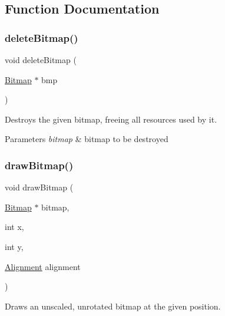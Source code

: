 \subsection{Function Documentation}
\hypertarget{group___bitmap_ga08c1d4f4fff81df260d979ea8fc1aa61}{}\label{group___bitmap_ga08c1d4f4fff81df260d979ea8fc1aa61} 
\subsubsection{\texorpdfstring{delete\+Bitmap()}{deleteBitmap()}}
{\footnotesize\ttfamily void delete\+Bitmap (\begin{DoxyParamCaption}\item[{\hyperlink{struct_bitmap}{Bitmap} $\ast$}]{bmp }\end{DoxyParamCaption})}



Destroys the given bitmap, freeing all resources used by it. 


\begin{DoxyParams}{Parameters}
{\em bitmap} & bitmap to be destroyed \\
\hline
\end{DoxyParams}
\hypertarget{group___bitmap_ga18d05a1c671f4638bc63d37874efb9d4}{}\label{group___bitmap_ga18d05a1c671f4638bc63d37874efb9d4} 
\subsubsection{\texorpdfstring{draw\+Bitmap()}{drawBitmap()}}
{\footnotesize\ttfamily void draw\+Bitmap (\begin{DoxyParamCaption}\item[{\hyperlink{struct_bitmap}{Bitmap} $\ast$}]{bitmap,  }\item[{int}]{x,  }\item[{int}]{y,  }\item[{\hyperlink{group___bitmap_gacdfaca60ec19c0265bac2692d7982726}{Alignment}}]{alignment }\end{DoxyParamCaption})}



Draws an unscaled, unrotated bitmap at the given position. 


